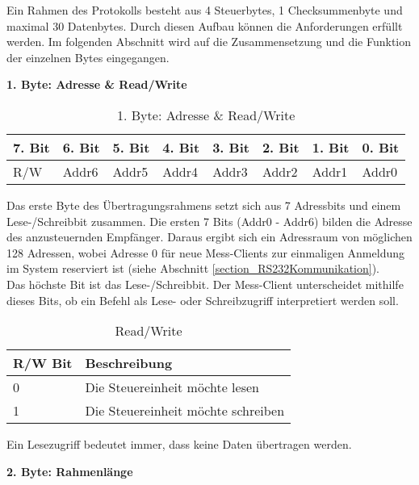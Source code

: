 Ein Rahmen des Protokolls besteht aus 4 Steuerbytes, 1 Checksummenbyte und maximal 30 Datenbytes. Durch diesen Aufbau können die Anforderungen erfüllt werden. Im folgenden Abschnitt wird auf die Zusammensetzung und die Funktion der einzelnen Bytes eingegangen.


\textbf{1. Byte: Adresse \& Read/Write}

\begin{table}[H]
\begin{center}
\begin{tabularx}{\textwidth}{|X|X|X|X|X|X|X|X|}\hline
 7. Bit & 6. Bit & 5. Bit & 4. Bit & 3. Bit & 2. Bit & 1. Bit & 0. Bit\\ \hline
 R/W & Addr6 & Addr5 & Addr4 & Addr3 & Addr2 & Addr1 & Addr0\\ \hline
\end{tabularx}
\caption{1. Byte: Adresse \& Read/Write}
\label{table_1Byte}
\end{center}
\end{table}

Das erste Byte des Übertragungsrahmens setzt sich aus 7 Adressbits und einem Lese-/Schreibbit zusammen. Die ersten 7 Bits (Addr0 - Addr6) bilden die Adresse des anzusteuernden Empfänger. Daraus ergibt sich ein Adressraum von möglichen 128 Adressen, wobei Adresse 0 für neue Mess-Clients zur einmaligen Anmeldung im System reserviert ist (siehe Abschnitt \ref{section_RS232Kommunikation}).\\
Das höchste Bit ist das Lese-/Schreibbit. Der Mess-Client unterscheidet mithilfe dieses Bits, ob ein Befehl als Lese- oder Schreibzugriff interpretiert werden soll.\\

\begin{table}[H]
\begin{center}
\begin{tabular}{|l|l|}\hline
 R/W Bit & Beschreibung \\ \hline
 0 & Die Steuereinheit möchte lesen \\ \hline
 1 & Die Steuereinheit möchte schreiben \\ \hline
\end{tabular}
\caption{Read/Write}
\label{table_RW}
\end{center}
\end{table}

Ein Lesezugriff bedeutet immer, dass keine Daten übertragen werden.

\textbf{2. Byte: Rahmenlänge}

